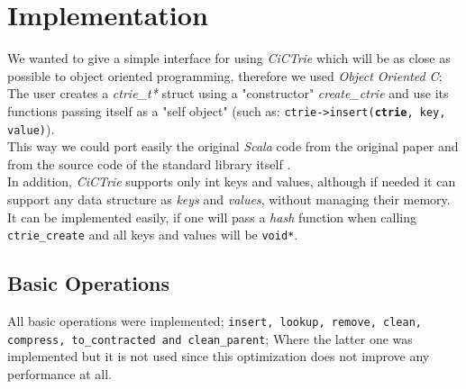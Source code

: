 \documentclass[conference]{IEEEtran}
\begin{document}
\section{Implementation}
	
	We wanted to give a simple interface for using \textit{CiCTrie}\cite{cictrie} which will be as close  as possible to object oriented programming, therefore we used \textit{Object Oriented C}; The user creates a \textit{ctrie\_t*} struct using a "constructor" \textit{create\_ctrie} and use its functions passing itself as a "self object" (such as: \texttt{ctrie->insert(\textbf{ctrie}, key, value)}). \\
	This way we could port easily the original \textit{Scala} code from the original paper \cite{article} and from the source code of the standard library itself \cite{ctrie-scala-source-code}. \\
	In addition, \textit{CiCTrie} supports only int keys and values, although if needed it can support any data structure as \textit{keys} and \textit{values}, without managing their memory. It can be implemented easily, if one will pass a \textit{hash} function when calling \texttt{ctrie\_create} and all keys and values will be \texttt{void*}.
	
\subsection{Basic Operations}
	All basic operations were implemented; \texttt{insert, lookup, remove, clean, compress, to\_contracted and clean\_parent}; Where the latter one was implemented but it is not used since this optimization does not improve any performance at all.
	
\end{document}
